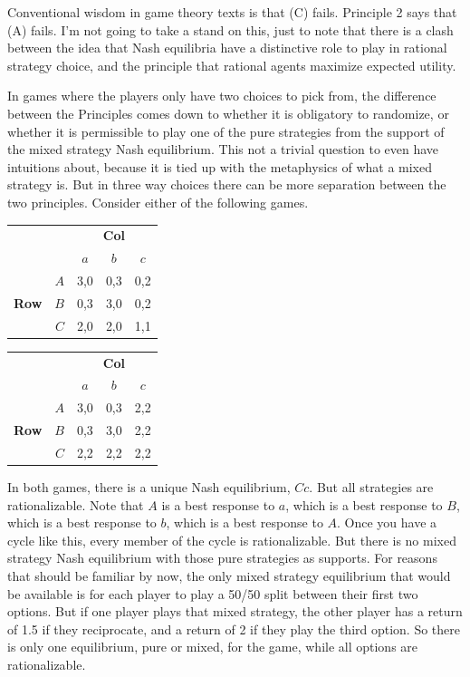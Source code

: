 \documentclass[openany]{book}
\begin{document}
Conventional wisdom in game theory texts is that (C) fails. Principle 2 says that (A) fails. I'm not going to take a stand on this, just to note that there is a clash between the idea that Nash equilibria have a distinctive role to play in rational strategy choice, and the principle that rational agents maximize expected utility.

In games where the players only have two choices to pick from, the difference between the Principles comes down to whether it is obligatory to randomize, or whether it is permissible to play one of the pure strategies from the support of the mixed strategy Nash equilibrium. This not a trivial question to even have intuitions about, because it is tied up with the metaphysics of what a mixed strategy is. But in three way choices there can be more separation between the two principles. Consider either of the following games.

\begin{center}
\begin{tabular}{l r | c c c}
& & \multicolumn{3}{c}{\textbf{Col}} \\
& & $a$ & $b$ & $c$ \\ \hline
\multirow{3}{*}{\textbf{Row}}
& $A$ & 3,0 & 0,3 & 0,2 \\
& $B$ & 0,3 & 3,0 & 0,2 \\
& $C$ & 2,0 & 2,0 & 1,1
\end{tabular}
\end{center}

\begin{center}
\begin{tabular}{l r | c c c}
& & \multicolumn{3}{c}{\textbf{Col}} \\
& & $a$ & $b$ & $c$ \\ \hline
\multirow{3}{*}{\textbf{Row}}
& $A$ & 3,0 & 0,3 & 2,2 \\
& $B$ & 0,3 & 3,0 & 2,2 \\
& $C$ & 2,2 & 2,2 & 2,2
\end{tabular}
\end{center}
In both games, there is a unique Nash equilibrium, $Cc$. But all strategies are rationalizable. Note that $A$ is a best response to $a$, which is a best response to $B$, which is a best response to $b$, which is a best response to $A$. Once you have a cycle like this, every member of the cycle is rationalizable. But there is no mixed strategy Nash equilibrium with those pure strategies as supports. For reasons that should be familiar by now, the only mixed strategy equilibrium that would be available is for each player to play a 50/50 split between their first two options. But if one player plays that mixed strategy, the other player has a return of 1.5 if they reciprocate, and a return of 2 if they play the third option. So there is only one equilibrium, pure or mixed, for the game, while all options are rationalizable.
\end{document}
